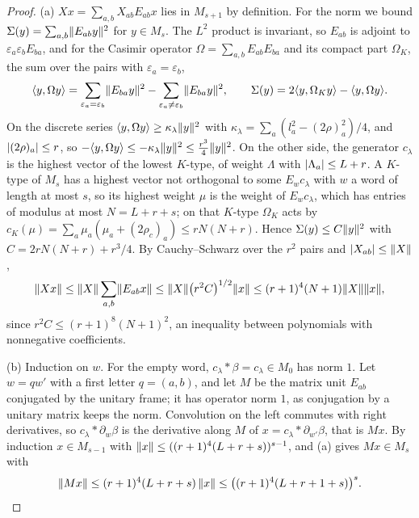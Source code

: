 \begin{proof}
(a) $Xx=\sum_{a,b}X_{ab}E_{ab}x$ lies in $M_{s+1}$ by definition. For the norm we bound $\Sigma(y)=\sum_{a,b}\lVert E_{ab}y\rVert^2$ for $y\in M_s$. The $L^2$ product is invariant, so $E_{ab}$ is adjoint to $\varepsilon_a\varepsilon_bE_{ba}$, and
for the Casimir operator $\Omega=\sum_{a,b}E_{ab}E_{ba}$ and its compact part $\Omega_K$, the sum over the pairs with $\varepsilon_a=\varepsilon_b$,
\[
  \langle y,\Omega y\rangle=\sum_{\varepsilon_a=\varepsilon_b}\lVert E_{ba}y\rVert^2-\sum_{\varepsilon_a\ne\varepsilon_b}\lVert E_{ba}y\rVert^2,\qquad \Sigma(y)=2\langle y,\Omega_Ky\rangle-\langle y,\Omega y\rangle.
\]
On the discrete series $\langle y,\Omega y\rangle\ge\kappa_\lambda\lVert y\rVert^2$ with $\kappa_\lambda=\sum_a(l_a^2-(2\rho)_a^2)/4$, and $\lvert (2\rho)_a\rvert\le r$, so $-\langle y,\Omega y\rangle\le-\kappa_\lambda\lVert y\rVert^2\le\frac{r^3}4\lVert y\rVert^2$. On the other side, the generator $c_\lambda$ is the highest
vector of the lowest $K$-type, of weight $\Lambda$ with $\lvert \Lambda_a\rvert\le L+r$. A $K$-type of $M_s$ has a highest vector not orthogonal to some $E_wc_\lambda$ with $w$ a word of length at most $s$, so its highest weight $\mu$ is the
weight of $E_wc_\lambda$, which has entries of modulus at most $N=L+r+s$; on that $K$-type $\Omega_K$ acts by $c_K(\mu)=\sum_a\mu_a(\mu_a+(2\rho_c)_a)\le rN(N+r)$. Hence $\Sigma(y)\le C\lVert y\rVert^2$ with
$C=2rN(N+r)+r^3/4$. By Cauchy--Schwarz over the $r^2$ pairs and $\lvert X_{ab}\rvert\le\lVert X\rVert$,
\[
  \lVert Xx\rVert\le\lVert X\rVert\sum_{a,b}\lVert E_{ab}x\rVert\le\lVert X\rVert\bigl(r^2C\bigr)^{1/2}\lVert x\rVert\le(r+1)^4(N+1)\lVert X\rVert\lVert x\rVert,
\]
since $r^2C\le(r+1)^8(N+1)^2$, an inequality between polynomials with nonnegative coefficients.

(b) Induction on $w$. For the empty word, $c_\lambda*\beta=c_\lambda\in M_0$ has norm $1$. Let $w=qw'$ with a first letter $q=(a,b)$, and let $M$ be the matrix unit $E_{ab}$ conjugated by the unitary frame; it has
operator norm $1$, as conjugation by a unitary matrix keeps the norm. Convolution on the left commutes with right derivatives, so $c_\lambda*\partial_w\beta$ is the derivative along $M$ of $x=c_\lambda*\partial_{w'}\beta$, that is $Mx$. By induction
$x\in M_{s-1}$ with $\lVert x\rVert\le((r+1)^4(L+r+s))^{s-1}$, and (a) gives $Mx\in M_s$ with
\[
  \lVert Mx\rVert\le(r+1)^4(L+r+s)\,\lVert x\rVert\le\bigl((r+1)^4(L+r+1+s)\bigr)^s.\qedhere
\]
\end{proof}

